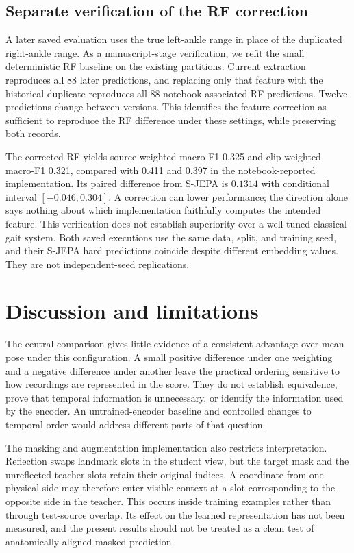 \documentclass[10pt,twocolumn,letterpaper]{article}
\begin{document}
\subsection{Separate verification of the RF correction}
A later saved evaluation uses the true left-ankle range in place of the duplicated right-ankle range. As a manuscript-stage verification, we refit the small deterministic RF baseline on the existing partitions. Current extraction reproduces all 88 later predictions, and replacing only that feature with the historical duplicate reproduces all 88 notebook-associated RF predictions. Twelve predictions change between versions. This identifies the feature correction as sufficient to reproduce the RF difference under these settings, while preserving both records.

The corrected RF yields source-weighted macro-F1 0.325 and clip-weighted macro-F1 0.321, compared with 0.411 and 0.397 in the notebook-reported implementation. Its paired difference from S-JEPA is $0.1314$ with conditional interval $[-0.046,0.304]$. A correction can lower performance; the direction alone says nothing about which implementation faithfully computes the intended feature. This verification does not establish superiority over a well-tuned classical gait system. Both saved executions use the same data, split, and training seed, and their S-JEPA hard predictions coincide despite different embedding values. They are not independent-seed replications.

\section{Discussion and limitations}
The central comparison gives little evidence of a consistent advantage over mean pose under this configuration. A small positive difference under one weighting and a negative difference under another leave the practical ordering sensitive to how recordings are represented in the score. They do not establish equivalence, prove that temporal information is unnecessary, or identify the information used by the encoder. An untrained-encoder baseline and controlled changes to temporal order would address different parts of that question.

The masking and augmentation implementation also restricts interpretation. Reflection swaps landmark slots in the student view, but the target mask and the unreflected teacher slots retain their original indices. A coordinate from one physical side may therefore enter visible context at a slot corresponding to the opposite side in the teacher. This occurs inside training examples rather than through test-source overlap. Its effect on the learned representation has not been measured, and the present results should not be treated as a clean test of anatomically aligned masked prediction.
\end{document}
